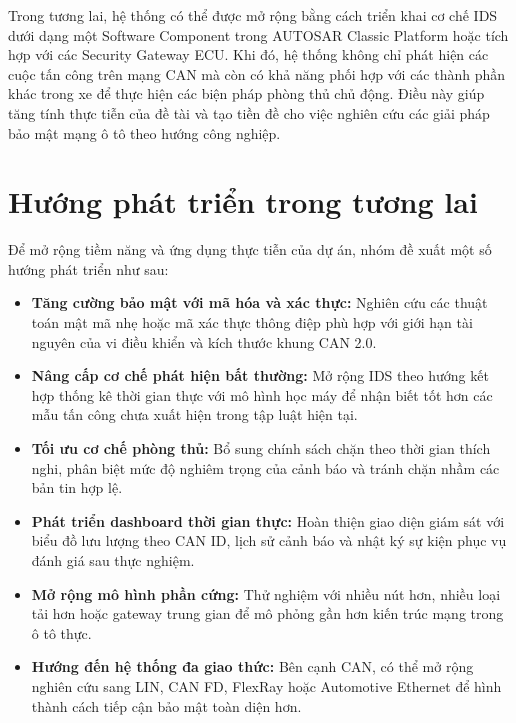Trong tương lai, hệ thống có thể được mở rộng bằng cách triển khai cơ chế IDS dưới dạng một Software Component trong AUTOSAR Classic Platform hoặc tích hợp với các Security Gateway ECU. Khi đó, hệ thống không chỉ phát hiện các cuộc tấn công trên mạng CAN mà còn có khả năng phối hợp với các thành phần khác trong xe để thực hiện các biện pháp phòng thủ chủ động. Điều này giúp tăng tính thực tiễn của đề tài và tạo tiền đề cho việc nghiên cứu các giải pháp bảo mật mạng ô tô theo hướng công nghiệp.

\section{Hướng phát triển trong tương lai}
Để mở rộng tiềm năng và ứng dụng thực tiễn của dự án, nhóm đề xuất một số hướng phát triển như sau:

\begin{itemize}[leftmargin=*]
    \item \textbf{Tăng cường bảo mật với mã hóa và xác thực:} Nghiên cứu các thuật toán mật mã nhẹ hoặc mã xác thực thông điệp phù hợp với giới hạn tài nguyên của vi điều khiển và kích thước khung CAN 2.0.
    \item \textbf{Nâng cấp cơ chế phát hiện bất thường:} Mở rộng IDS theo hướng kết hợp thống kê thời gian thực với mô hình học máy để nhận biết tốt hơn các mẫu tấn công chưa xuất hiện trong tập luật hiện tại.
    \item \textbf{Tối ưu cơ chế phòng thủ:} Bổ sung chính sách chặn theo thời gian thích nghi, phân biệt mức độ nghiêm trọng của cảnh báo và tránh chặn nhầm các bản tin hợp lệ.
    \item \textbf{Phát triển dashboard thời gian thực:} Hoàn thiện giao diện giám sát với biểu đồ lưu lượng theo CAN ID, lịch sử cảnh báo và nhật ký sự kiện phục vụ đánh giá sau thực nghiệm.
    \item \textbf{Mở rộng mô hình phần cứng:} Thử nghiệm với nhiều nút hơn, nhiều loại tải hơn hoặc gateway trung gian để mô phỏng gần hơn kiến trúc mạng trong ô tô thực.
    \item \textbf{Hướng đến hệ thống đa giao thức:} Bên cạnh CAN, có thể mở rộng nghiên cứu sang LIN, CAN FD, FlexRay hoặc Automotive Ethernet để hình thành cách tiếp cận bảo mật toàn diện hơn.
\end{itemize}
